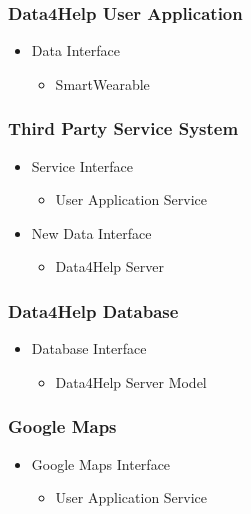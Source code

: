 \documentclass[../../DD.tex]{subfiles}
\begin{document}
		\subsubsection{Data4Help User Application}
		\begin{itemize}
			\item Data Interface
			\begin{itemize}
				\item SmartWearable 
			\end{itemize}
		\end{itemize}

		\subsubsection{Third Party Service System}
		\begin{itemize}
			\item Service Interface
			\begin{itemize}
				\item User Application Service
			\end{itemize}
			\item New Data Interface
			\begin{itemize}
				\item Data4Help Server 
			\end{itemize}
		\end{itemize}

		\subsubsection{Data4Help Database}
		\begin{itemize}
			\item Database Interface
			\begin{itemize}
				\item Data4Help Server Model
			\end{itemize}
		\end{itemize}

		\subsubsection{Google Maps}
		\begin{itemize}
			\item Google Maps Interface 
			\begin{itemize}
				\item User Application Service
			\end{itemize}
		\end{itemize}
\end{document}
